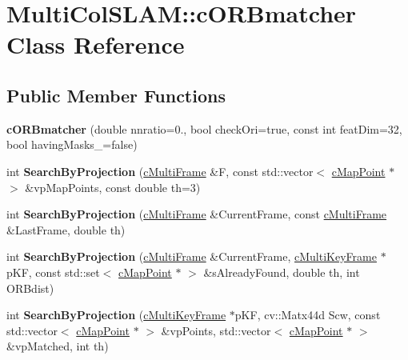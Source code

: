 \hypertarget{classMultiColSLAM_1_1cORBmatcher}{}\section{Multi\+Col\+S\+L\+AM\+:\+:c\+O\+R\+Bmatcher Class Reference}
\label{classMultiColSLAM_1_1cORBmatcher}
\subsection*{Public Member Functions}
\begin{DoxyCompactItemize}
\item 
{\bfseries c\+O\+R\+Bmatcher} (double nnratio=0., bool check\+Ori=true, const int feat\+Dim=32, bool having\+Masks\+\_\+=false)\hypertarget{classMultiColSLAM_1_1cORBmatcher_a0fcf09c0eb5594d049363c710316b58f}{}\label{classMultiColSLAM_1_1cORBmatcher_a0fcf09c0eb5594d049363c710316b58f}

\item 
int {\bfseries Search\+By\+Projection} (\hyperlink{classMultiColSLAM_1_1cMultiFrame}{c\+Multi\+Frame} \&F, const std\+::vector$<$ \hyperlink{classMultiColSLAM_1_1cMapPoint}{c\+Map\+Point} $\ast$ $>$ \&vp\+Map\+Points, const double th=3)\hypertarget{classMultiColSLAM_1_1cORBmatcher_a778ce7c887b93ee81a1f7200aec9c106}{}\label{classMultiColSLAM_1_1cORBmatcher_a778ce7c887b93ee81a1f7200aec9c106}

\item 
int {\bfseries Search\+By\+Projection} (\hyperlink{classMultiColSLAM_1_1cMultiFrame}{c\+Multi\+Frame} \&Current\+Frame, const \hyperlink{classMultiColSLAM_1_1cMultiFrame}{c\+Multi\+Frame} \&Last\+Frame, double th)\hypertarget{classMultiColSLAM_1_1cORBmatcher_add40b15c65cf307aff3c21047ad20187}{}\label{classMultiColSLAM_1_1cORBmatcher_add40b15c65cf307aff3c21047ad20187}

\item 
int {\bfseries Search\+By\+Projection} (\hyperlink{classMultiColSLAM_1_1cMultiFrame}{c\+Multi\+Frame} \&Current\+Frame, \hyperlink{classMultiColSLAM_1_1cMultiKeyFrame}{c\+Multi\+Key\+Frame} $\ast$p\+KF, const std\+::set$<$ \hyperlink{classMultiColSLAM_1_1cMapPoint}{c\+Map\+Point} $\ast$ $>$ \&s\+Already\+Found, double th, int O\+R\+Bdist)\hypertarget{classMultiColSLAM_1_1cORBmatcher_a938c9070dd5c37d5b8c77ad3875c606f}{}\label{classMultiColSLAM_1_1cORBmatcher_a938c9070dd5c37d5b8c77ad3875c606f}

\item 
int {\bfseries Search\+By\+Projection} (\hyperlink{classMultiColSLAM_1_1cMultiKeyFrame}{c\+Multi\+Key\+Frame} $\ast$p\+KF, cv\+::\+Matx44d Scw, const std\+::vector$<$ \hyperlink{classMultiColSLAM_1_1cMapPoint}{c\+Map\+Point} $\ast$ $>$ \&vp\+Points, std\+::vector$<$ \hyperlink{classMultiColSLAM_1_1cMapPoint}{c\+Map\+Point} $\ast$ $>$ \&vp\+Matched, int th)\hypertarget{classMultiColSLAM_1_1cORBmatcher_aab1be10f9edd5371b12eb9931878c37f}{}\label{classMultiColSLAM_1_1cORBmatcher_aab1be10f9edd5371b12eb9931878c37f}


\end{DoxyCompactItemize}
